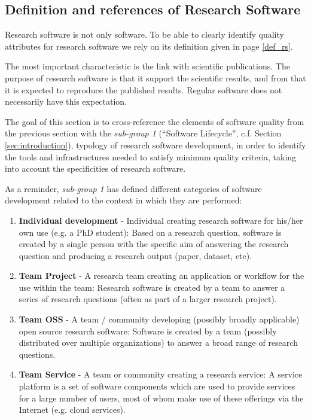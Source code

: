 \subsection{Definition and references of Research Software}
\label{subsec:defrs}

Research software is not only software. To be able to clearly identify quality attributes for research software we rely on its definition given in page \ref{def_rs}.

The most important characteristic is the link with scientific publications. The purpose of research software is that it support the scientific results, and from that it is expected to reproduce the published results. Regular software does not necessarily have this expectation.

The goal of this section is to cross-reference the elements of software quality from the previous section with the \textit{sub-group 1} \cite{sg1tf2023} (``Software Lifecycle'', c.f. Section \ref{sec:introduction}), typology of research software development, in order to identify the tools and infrastructures needed to satisfy minimum quality criteria, taking into account the specificities of research software.  

As a reminder, \textit{sub-group 1} has defined different categories of software development related to the context in which they are performed:

\begin{enumerate}
    \item \textbf{Individual development} - Individual creating research software for his/her own use (e.g. a PhD student): Based on a research question, software is created by a single person with the specific aim of answering the research question and producing a research output (paper, dataset, etc).
    \item \textbf{Team Project} - A research team creating an application or workflow for the use within the team: Research software is created by a team to answer a series of research questions (often as part of a larger research project).
    \item \textbf{Team OSS} - A team / community developing (possibly broadly applicable) open source research software: Software is created by a team (possibly distributed over multiple organizations) to answer a broad range of research questions.
    \item \textbf{Team Service} - A team or community creating a research service: A service platform is a set of software components which are used to provide services for a large number of users, most of whom make use of these offerings via the Internet (e.g. cloud services).
\end{enumerate}

